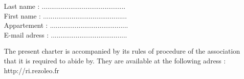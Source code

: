 \documentclass[12pt]{article}
\begin{document}
\begin{flushright}

	Last name : ............................................\\
	First name : ............................................\\
	Appartement : .........................................\\
	E-mail adress : ........................................\\

\end{flushright}

\vspace*{0.5cm}


The present charter is accompanied by its rules of procedure of the association that it is required to
abide by. They are available at the following adress : http://ri.rezoleo.fr 

\vspace*{0.5cm}
\end{document}
